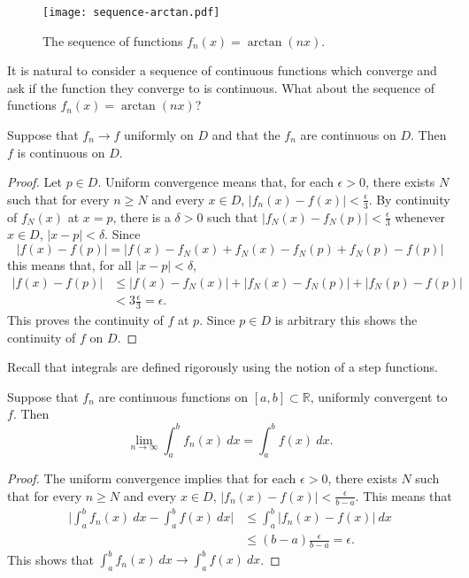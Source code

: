 \begin{figure}
  \begin{center}
    \texttt{[image: sequence-arctan.pdf]}
    \caption{The sequence of functions \(f_n(x)= \arctan(nx)\).}
  \end{center}
\end{figure}

It is natural to consider a sequence of continuous functions which converge and ask if the function they converge to is continuous.
What about the sequence of functions \(f_n(x) = \arctan (nx)\)?

\begin{theorem}%
  \label{thm:continuous-limit}
  Suppose that \(f_n \to f\) uniformly on \(D\) and that the \(f_n\) are continuous on \(D\).
  Then \(f\) is continuous on \(D\).
\end{theorem}


\begin{proof}
  Let \(p\in D\).
  Uniform convergence means that, for each \(\epsilon>0\), there exists \(N\) such that for every \(n\geq N\) and every \(x\in D\), \(|f_n(x) - f(x)| < \frac{\epsilon}{3}\).
  By continuity of \(f_N(x)\) at \(x=p\), there is a \(\delta >0\) such that \(|f_N(x)-f_N(p)| < \frac{\epsilon}{3} \) whenever \(x\in D\), \(|x-p| <\delta\).
  Since
  \[
    | f(x) - f(p) | = |f(x) - f_N(x) + f_N(x) - f_N(p) + f_N(p) - f(p) | \]
  this means that, for all \(|x-p| <\delta\),
  \[
    \begin{aligned}
      | f(x) - f(p) | & \leq   |f(x) - f_N(x)| + |f_N(x) - f_N(p)| + |f_N(p) - f(p) | \\
                      & < 3 \frac{\epsilon}{3} = \epsilon.
    \end{aligned}
  \]
  This proves the continuity of \(f\) at \(p\). Since \(p\in D\) is arbitrary this shows the continuity of \(f\) on \(D\).
\end{proof}


Recall that integrals are defined rigorously using the notion of a step functions.

\begin{theorem}%
  \label{thm:limit-of-integral}
  Suppose that \(f_n\) are continuous functions on \([a,b] \subset \mathbb{R}\), uniformly convergent to \(f\).
  Then
  \[
    \lim_{n\to \infty} \int_{a}^{b} f_n(x) \ dx = \int_{a}^{b} f(x) \ dx.
  \]
\end{theorem}

\begin{proof}
  The uniform convergence implies that for each \(\epsilon>0\), there exists \(N\) such that for every \(n\geq N\) and every \(x\in D\), \(|f_n(x) - f(x)| <  \frac{\epsilon}{b-a}\).
  This means that
  \[
    \begin{aligned}
      \Big| \int_{a}^{b} f_n(x) \ dx - \int_{a}^{b} f(x) \ dx \Big|
       & \leq \int_{a}^{b} | f_n(x) - f(x) | \ dx    \\
       & \leq (b-a) \frac{\epsilon}{b-a} = \epsilon.
    \end{aligned}
  \]
  This shows that \(\int_{a}^{b} f_n(x) \ dx \to  \int_{a}^{b} f(x) \ dx\).
\end{proof}


